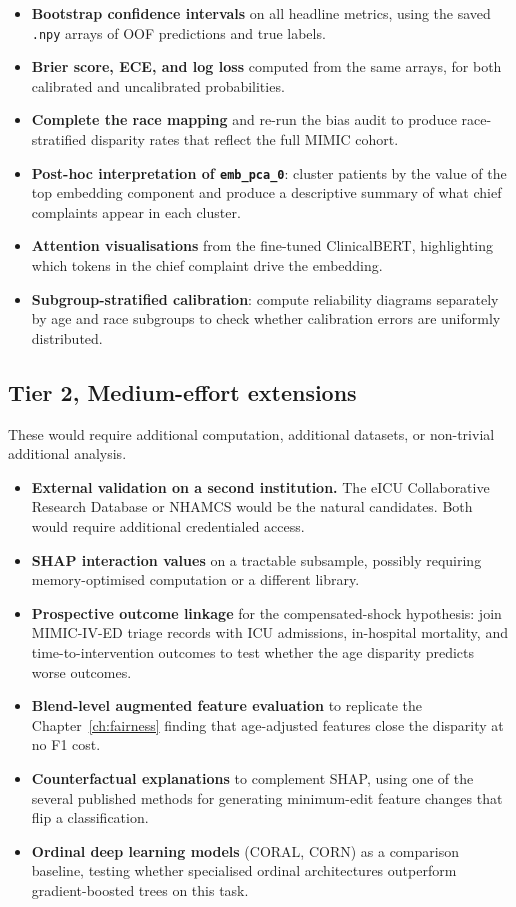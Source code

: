 \begin{itemize}
 \item \textbf{Bootstrap confidence intervals} on all headline metrics, using the saved \texttt{.npy} arrays of OOF predictions and true labels.
 \item \textbf{Brier score, ECE, and log loss} computed from the same arrays, for both calibrated and uncalibrated probabilities.
 \item \textbf{Complete the race mapping} and re-run the bias audit to produce race-stratified disparity rates that reflect the full MIMIC cohort.
 \item \textbf{Post-hoc interpretation of \texttt{emb\_pca\_0}}: cluster patients by the value of the top embedding component and produce a descriptive summary of what chief complaints appear in each cluster.
 \item \textbf{Attention visualisations} from the fine-tuned ClinicalBERT, highlighting which tokens in the chief complaint drive the embedding.
 \item \textbf{Subgroup-stratified calibration}: compute reliability diagrams separately by age and race subgroups to check whether calibration errors are uniformly distributed.
\end{itemize}

\subsection*{Tier 2, Medium-effort extensions}

These would require additional computation, additional datasets, or non-trivial additional analysis.

\begin{itemize}
 \item \textbf{External validation on a second institution.} The eICU Collaborative Research Database or NHAMCS would be the natural candidates. Both would require additional credentialed access.
 \item \textbf{SHAP interaction values} on a tractable subsample, possibly requiring memory-optimised computation or a different library.
 \item \textbf{Prospective outcome linkage} for the compensated-shock hypothesis: join MIMIC-IV-ED triage records with ICU admissions, in-hospital mortality, and time-to-intervention outcomes to test whether the age disparity predicts worse outcomes.
 \item \textbf{Blend-level augmented feature evaluation} to replicate the Chapter~\ref{ch:fairness} finding that age-adjusted features close the disparity at no F1 cost.
 \item \textbf{Counterfactual explanations} to complement SHAP, using one of the several published methods for generating minimum-edit feature changes that flip a classification.
 \item \textbf{Ordinal deep learning models} (CORAL, CORN) as a comparison baseline, testing whether specialised ordinal architectures outperform gradient-boosted trees on this task.
\end{itemize}

